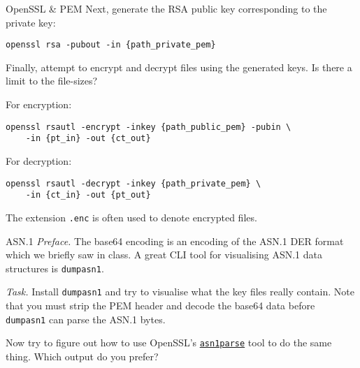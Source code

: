 \documentclass{practice}
\begin{document}
\begin{task}{OpenSSL \& PEM}
  Next, generate the RSA public key corresponding to the private key:
  \begin{Verbatim}
openssl rsa -pubout -in {path_private_pem}
  \end{Verbatim}

  Finally, attempt to encrypt and decrypt files using the generated keys.
  Is there a limit to the file-sizes?

  For encryption:
  \begin{Verbatim}
openssl rsautl -encrypt -inkey {path_public_pem} -pubin \
    -in {pt_in} -out {ct_out}
  \end{Verbatim}

  For decryption:
  \begin{Verbatim}
openssl rsautl -decrypt -inkey {path_private_pem} \
    -in {ct_in} -out {pt_out}  
  \end{Verbatim}

  The extension \texttt{.enc} is often used to denote encrypted files.
\end{task}

\begin{task}{ASN.1}
  \textit{Preface.}
  The base64 encoding is an encoding of the ASN.1 DER format which we briefly saw in class.
  A great CLI tool for visualising ASN.1 data structures is \texttt{dumpasn1}.

  \textit{Task.}
  Install \texttt{dumpasn1} and try to visualise what the key files really contain.
  Note that you must strip the PEM header and decode the base64 data before \texttt{dumpasn1} can parse the ASN.1 bytes.

  Now try to figure out how to use OpenSSL's \href{https://www.openssl.org/docs/man1.1.1/man1/openssl-asn1parse.html}{\texttt{asn1parse}} tool to do the same thing.
  Which output do you prefer?
\end{task}
\end{document}
